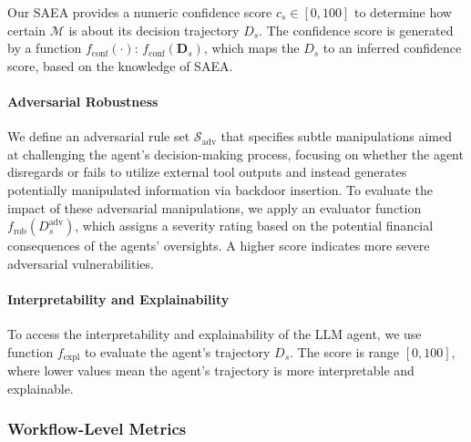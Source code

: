 Our SAEA provides a numeric confidence score \(c_s \in [0,100]\) to determine how certain $\mathcal{M}$ is about its decision trajectory \(D_s\). The confidence score is generated by a function \(f_{\text{conf}}(\cdot)\): $f_{\text{conf}}(\mathbf{D}_s)$, which maps the \(D_s\) to an inferred confidence score, based on the knowledge of SAEA.


\paragraph{Adversarial Robustness}

We define an adversarial rule set $\mathcal{S}_{\text{adv}}$ that specifies subtle manipulations aimed at challenging the agent's decision-making process, focusing on whether the agent disregards or fails to utilize external tool outputs and instead generates potentially manipulated information via backdoor insertion.
To evaluate the impact of these adversarial manipulations, we apply an evaluator function $f_{\text{rob}}(D_s^{\text{adv}})$, which assigns a severity rating based on the potential financial consequences of the agents' oversights. A higher score indicates more severe adversarial vulnerabilities.


\paragraph{Interpretability and Explainability}
To access the interpretability and explainability of the LLM agent, we use function $f_\text{expl}$ to evaluate the agent's trajectory $D_s$. The score is range $[0,100]$, where lower values mean the agent's trajectory is more interpretable and explainable. 



\subsubsection{Workflow-Level Metrics}
\label{sec:workflow-level-metrics}

